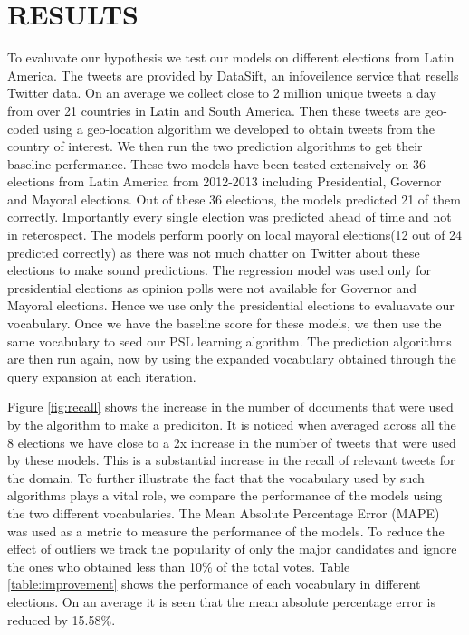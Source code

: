 \section{RESULTS}
To evaluvate our hypothesis we test our models on different elections from Latin America.
The tweets are provided by DataSift, an infoveilence service that resells Twitter data.
On an average we collect close to 2 million unique tweets a day from over 21 countries in Latin and South America.
Then these tweets are geo-coded using a geo-location algorithm we developed to obtain tweets from the country of interest.
We then run the two prediction algorithms to get their baseline perfermance.
These two models have been tested extensively on 36 elections from Latin America from 2012-2013 including Presidential, Governor and Mayoral elections. 
Out of these 36 elections, the models predicted 21 of them correctly. 
Importantly every single election was predicted ahead of time and not in reterospect.
The models perform poorly on local mayoral elections(12 out of 24 predicted correctly) as there was not much chatter on Twitter about these elections to make sound predictions. 
The regression model was used only for presidential elections as opinion polls were not available for Governor and Mayoral elections.
Hence we use only the presidential elections to evaluavate our vocabulary.
Once we have the baseline score for these models, we then use the same vocabulary to seed our PSL learning algorithm. 
The prediction algorithms are then run again, now by using the expanded vocabulary obtained through the query expansion at each iteration.

Figure \ref{fig:recall} shows the increase in the number of documents that were used by the algorithm to make a prediciton.
It is noticed when averaged across all the 8 elections we have close to a 2x increase in the number of tweets that were used by these models.
This is a substantial increase in the recall of relevant tweets for the domain.
To further illustrate the fact that the vocabulary used by such algorithms plays a vital role, we compare the performance of the models using the two different vocabularies.
The Mean Absolute Percentage Error (MAPE) was used as a metric to measure the performance of the models. 
To reduce the effect of outliers we track the popularity of only the major candidates and ignore the ones who obtained less than 10\% of the total votes.
Table \ref{table:improvement} shows the performance of each vocabulary in different elections. 
On an average it is seen that the mean absolute percentage error is reduced by 15.58\%.
